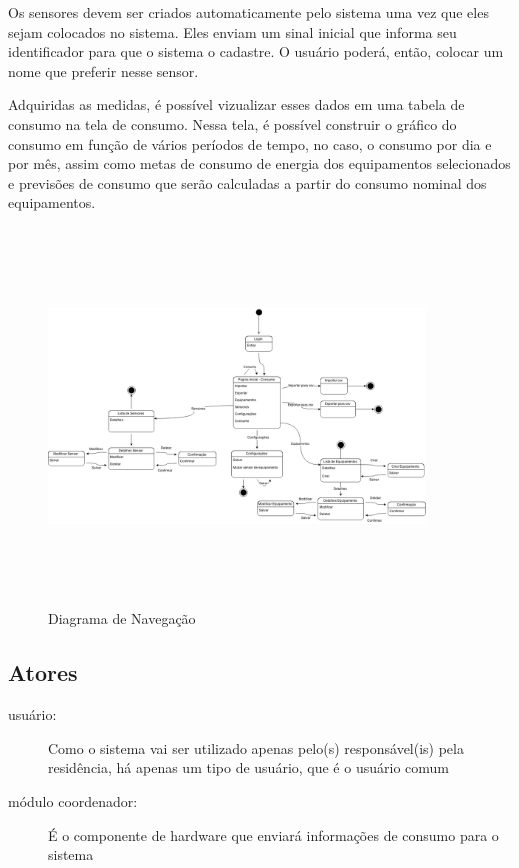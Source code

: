 Os sensores devem ser criados automaticamente pelo sistema uma vez que eles sejam colocados no sistema. Eles enviam um sinal inicial que informa seu identificador para que o sistema o cadastre. O usuário poderá, então, colocar um nome que preferir nesse sensor.

Adquiridas as medidas, é possível vizualizar esses dados em uma tabela de consumo na tela de consumo. Nessa tela, é possível construir o gráfico do consumo em função de vários períodos de tempo, no caso, o consumo por dia e por mês, assim como metas de consumo de energia dos equipamentos selecionados e previsões de consumo que serão calculadas a partir do consumo nominal dos equipamentos.

\begin{figure}[H]
\begin{center}
\includegraphics[width=10cm,height=10cm,keepaspectratio]{figuras/diagrama_navegacao.png}
\caption{\label{fig:diagrama-navegacao} Diagrama de Navegação}
\end{center}
\end{figure}
%
\subsection{Atores}
\begin{description}
	\item[usuário:] Como o sistema vai ser utilizado apenas pelo(s) responsável(is) pela residência, há apenas um tipo de usuário, que é o usuário comum
    \item[módulo coordenador:] É o componente de hardware que enviará informações de consumo para o sistema
\end{description}

%
